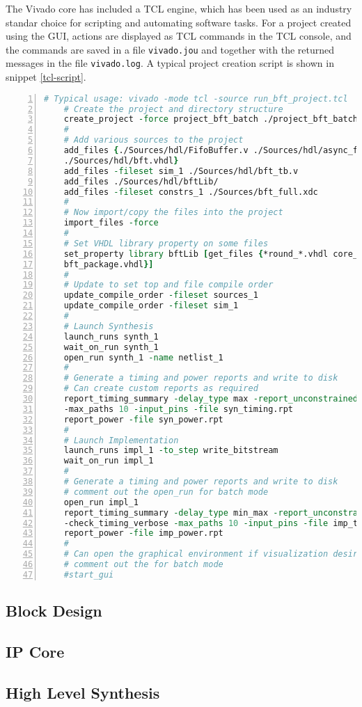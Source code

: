 The Vivado core has included a TCL engine, which has been used as an industry standar choice for
scripting and automating software tasks. For a project created using the GUI, actions are displayed
as TCL commands in the TCL console, and the commands are saved in a file \texttt{vivado.jou} and
together with the returned messages in the file \texttt{vivado.log}. A typical project creation
script is shown in snippet \ref{tcl-script}.

\begin{lstlisting}[language=tcl, basicstyle=\scriptsize\ttfamily, tabsize=2,
	commentstyle=\color{darkgray}, keywordstyle=\color{blue}, backgroundcolor=\color{lightgray},
	morekeywords={create_project, add_files, import_files, set_property, update_compile_order,
	launch_runs, wait_on_run, open_run, report_timming_summary, report_power}, breaklines=true,
	numbers=left, float=htb,
	caption={[TCL project creation example]TCL project creation example, from \cite{UG895}},
	label={tcl-script}]
	# Typical usage: vivado -mode tcl -source run_bft_project.tcl
	# Create the project and directory structure
	create_project -force project_bft_batch ./project_bft_batch -part xc7z010-clg225-1
	#
	# Add various sources to the project
	add_files {./Sources/hdl/FifoBuffer.v ./Sources/hdl/async_fifo.v \
	./Sources/hdl/bft.vhdl}
	add_files -fileset sim_1 ./Sources/hdl/bft_tb.v
	add_files ./Sources/hdl/bftLib/
	add_files -fileset constrs_1 ./Sources/bft_full.xdc
	#
	# Now import/copy the files into the project
	import_files -force
	#
	# Set VHDL library property on some files
	set_property library bftLib [get_files {*round_*.vhdl core_transform.vhdl \
	bft_package.vhdl}]
	#
	# Update to set top and file compile order
	update_compile_order -fileset sources_1
	update_compile_order -fileset sim_1
	#
	# Launch Synthesis
	launch_runs synth_1
	wait_on_run synth_1
	open_run synth_1 -name netlist_1
	#
	# Generate a timing and power reports and write to disk
	# Can create custom reports as required
	report_timing_summary -delay_type max -report_unconstrained -check_timing_verbose \
	-max_paths 10 -input_pins -file syn_timing.rpt
	report_power -file syn_power.rpt
	#
	# Launch Implementation
	launch_runs impl_1 -to_step write_bitstream
	wait_on_run impl_1
	#
	# Generate a timing and power reports and write to disk
	# comment out the open_run for batch mode
	open_run impl_1
	report_timing_summary -delay_type min_max -report_unconstrained \
	-check_timing_verbose -max_paths 10 -input_pins -file imp_timing.rpt
	report_power -file imp_power.rpt
	#
	# Can open the graphical environment if visualization desired
	# comment out the for batch mode
	#start_gui
\end{lstlisting}

\subsection{Block Design}


\subsection{IP Core}

\subsection{High Level Synthesis}
